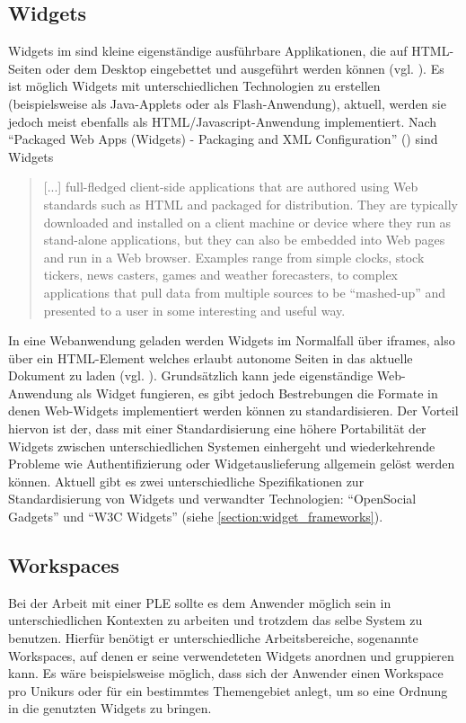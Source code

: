 \subsection{Widgets}\label{section:widgets}
Widgets im sind kleine eigenständige ausführbare Applikationen, die auf HTML-Seiten oder dem Desktop eingebettet und ausgeführt werden können (vgl. \cite{Taraghi2010}). Es ist möglich Widgets mit unterschiedlichen Technologien zu erstellen (beispielsweise als Java-Applets oder als Flash-Anwendung), aktuell, werden sie jedoch meist ebenfalls als HTML/Javascript-Anwendung implementiert. Nach "`Packaged Web Apps (Widgets) - Packaging and XML Configuration"' (\cite{W3C-11-2012}) sind Widgets
\begin{quotation}[...] full-fledged client-side applications that are authored using Web standards such as HTML and packaged for distribution. They are typically downloaded and installed on a client machine or device where they run as stand-alone applications, but they can also be embedded into Web pages and run in a Web browser. Examples range from simple clocks, stock tickers, news casters, games and weather forecasters, to complex applications that pull data from multiple sources to be "`mashed-up"' and presented to a user in some interesting and useful way.\end{quotation}
In eine Webanwendung geladen werden Widgets im Normalfall über iframes, also über ein HTML-Element welches erlaubt autonome Seiten in das aktuelle Dokument zu laden (vgl. \cite{W3C1999}). Grundsätzlich kann jede eigenständige Web-Anwendung als Widget fungieren, es gibt jedoch Bestrebungen die Formate in denen Web-Widgets implementiert werden können zu standardisieren. Der Vorteil hiervon ist der, dass mit einer Standardisierung eine höhere Portabilität der Widgets zwischen unterschiedlichen Systemen einhergeht und wiederkehrende Probleme wie Authentifizierung oder Widgetauslieferung allgemein gelöst werden können. Aktuell gibt es zwei unterschiedliche Spezifikationen zur Standardisierung von Widgets und verwandter Technologien: "`OpenSocial Gadgets"' und "`W3C Widgets"' (siehe \ref{section:widget_frameworks}).

\subsection{Workspaces}
Bei der Arbeit mit einer PLE sollte es dem Anwender möglich sein in unterschiedlichen Kontexten zu arbeiten und trotzdem das selbe System zu benutzen. Hierfür benötigt er unterschiedliche Arbeitsbereiche, sogenannte Workspaces, auf denen er seine verwendeteten Widgets anordnen und gruppieren kann. Es wäre beispielsweise möglich, dass sich der Anwender einen Workspace pro Unikurs oder für ein bestimmtes Themengebiet anlegt, um so eine Ordnung in die genutzten Widgets zu bringen. 